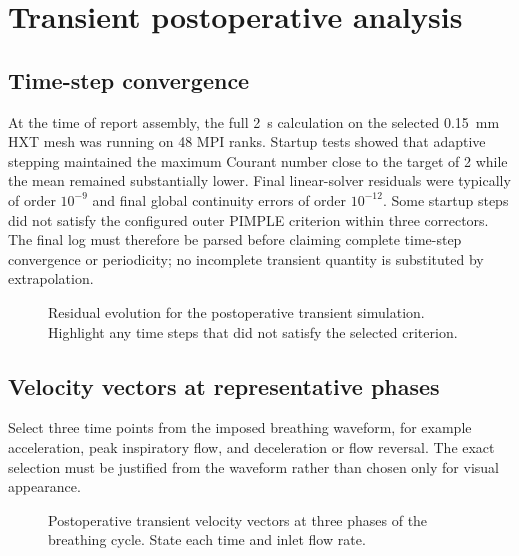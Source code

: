 \documentclass[11pt,a4paper]{article}
\begin{document}
\section{Transient postoperative analysis}
\label{sec:transient_results}

\subsection{Time-step convergence}

At the time of report assembly, the full \SI{2}{\second} calculation on the
selected \num{0.15}~mm HXT mesh was running on 48 MPI ranks. Startup tests showed
that adaptive stepping maintained the maximum Courant number close to the target
of 2 while the mean remained substantially lower. Final linear-solver residuals
were typically of order $10^{-9}$ and final global continuity errors of order
$10^{-12}$. Some startup steps did not satisfy the configured outer PIMPLE
criterion within three correctors. The final log must therefore be parsed before
claiming complete time-step convergence or periodicity; no incomplete transient
quantity is substituted by extrapolation.

\begin{figure}[htbp]
  \centering
  \caption{Residual evolution for the postoperative transient simulation.
  Highlight any time steps that did not satisfy the selected criterion.}
  \label{fig:transient_residuals}
\end{figure}

\subsection{Velocity vectors at representative phases}

Select three time points from the imposed breathing waveform, for example
acceleration, peak inspiratory flow, and deceleration or flow reversal. The
exact selection must be justified from the waveform rather than chosen only for
visual appearance.

\begin{figure}[htbp]
  \centering
  \caption{Postoperative transient velocity vectors at three phases of the
  breathing cycle. State each time and inlet flow rate.}
  \label{fig:transient_vectors}
\end{figure}
\end{document}
